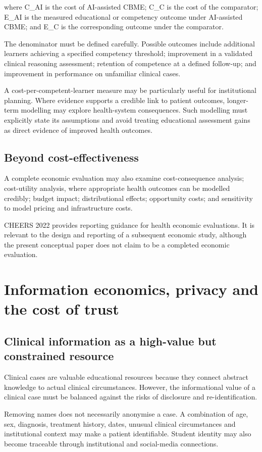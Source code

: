 \documentclass[11pt,a4paper]{article}
\begin{document}
where C\_AI is the cost of AI-assisted CBME; C\_C is the cost of the comparator; E\_AI is the measured educational or competency outcome under AI-assisted CBME; and E\_C is the corresponding outcome under the comparator.

The denominator must be defined carefully. Possible outcomes include additional learners achieving a specified competency threshold; improvement in a validated clinical reasoning assessment; retention of competence at a defined follow-up; and improvement in performance on unfamiliar clinical cases.

A cost-per-competent-learner measure may be particularly useful for institutional planning. Where evidence supports a credible link to patient outcomes, longer-term modelling may explore health-system consequences. Such modelling must explicitly state its assumptions and avoid treating educational assessment gains as direct evidence of improved health outcomes.

\subsection{Beyond cost-effectiveness}
A complete economic evaluation may also examine cost-consequence analysis; cost-utility analysis, where appropriate health outcomes can be modelled credibly; budget impact; distributional effects; opportunity costs; and sensitivity to model pricing and infrastructure costs.

CHEERS 2022 provides reporting guidance for health economic evaluations. It is relevant to the design and reporting of a subsequent economic study, although the present conceptual paper does not claim to be a completed economic evaluation.

\section{Information economics, privacy and the cost of trust}
\subsection{Clinical information as a high-value but constrained resource}
Clinical cases are valuable educational resources because they connect abstract knowledge to actual clinical circumstances. However, the informational value of a clinical case must be balanced against the risks of disclosure and re-identification.

Removing names does not necessarily anonymise a case. A combination of age, sex, diagnosis, treatment history, dates, unusual clinical circumstances and institutional context may make a patient identifiable. Student identity may also become traceable through institutional and social-media connections.
\end{document}
